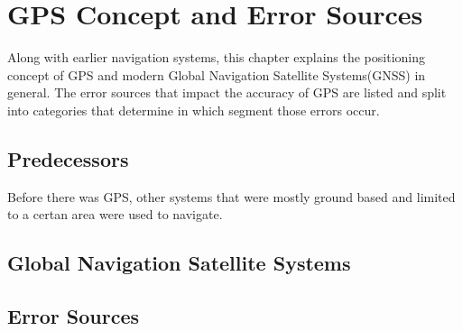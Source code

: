 \chapter{GPS Concept and Error Sources}

Along with earlier navigation systems, this chapter explains the positioning concept of GPS and modern Global Navigation Satellite Systems(GNSS) in general.
The error sources that impact the accuracy of GPS are listed and split into categories that determine in which segment those errors occur.

\section{Predecessors}
Before there was GPS, other systems that were mostly ground based and limited to a certan area were used to navigate.

\section{Global Navigation Satellite Systems}

\section{Error Sources}

